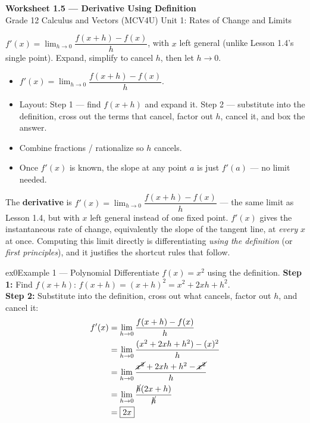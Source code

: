 \documentclass[11pt]{article}
\begin{document}
\begin{center}
{\LARGE\bfseries\color{titleblue}Worksheet 1.5 --- Derivative Using Definition}\\[2pt]
{\small Grade 12 Calculus and Vectors (MCV4U) \textperiodcentered{} Unit 1: Rates of Change and Limits}
\end{center}

\begin{ideabox}
$f'(x)=\displaystyle\lim_{h\to0}\dfrac{f(x+h)-f(x)}{h}$, with $x$ left general (unlike Lesson 1.4's single point). Expand, simplify to cancel $h$, then let $h\to0$.
\begin{itemize}[leftmargin=*,itemsep=2pt]
  \item $f'(x)=\displaystyle\lim_{h\to0}\dfrac{f(x+h)-f(x)}{h}$.
  \item Layout: Step 1 --- find $f(x+h)$ and expand it. Step 2 --- substitute into the definition, cross out the terms that cancel, factor out $h$, cancel it, and box the answer.
  \item Combine fractions / rationalize so $h$ cancels.
  \item Once $f'(x)$ is known, the slope at any point $a$ is just $f'(a)$ --- no limit needed.
\end{itemize}
\end{ideabox}

\begin{learnbox}
The \textbf{derivative} is $f'(x)=\displaystyle\lim_{h\to0}\dfrac{f(x+h)-f(x)}{h}$ — the same limit as Lesson 1.4, but with $x$ left general instead of one fixed point.
$f'(x)$ gives the instantaneous rate of change, equivalently the slope of the tangent line, at \emph{every} $x$ at once.
Computing this limit directly is differentiating \emph{using the definition} (or \emph{first principles}), and it justifies the shortcut rules that follow.
\end{learnbox}


\begin{example}{ex0}{Example 1 --- Polynomial}
Differentiate $f(x)=x^2$ using the definition.\soln
\textbf{Step 1:} Find $f(x+h)$: $f(x+h)=(x+h)^2=x^2+2xh+h^2$.\\[3pt]
\textbf{Step 2:} Substitute into the definition, cross out what cancels, factor out $h$, and cancel it:
\begin{align*}
f'(x)&=\lim_{h\to0}\frac{f(x+h)-f(x)}{h}\\
&=\lim_{h\to0}\frac{(x^2+2xh+h^2)-(x)^2}{h}\\
&=\lim_{h\to0}\frac{\cancel{x^2}+2xh+h^2-\cancel{x^2}}{h}\\
&=\lim_{h\to0}\frac{\cancel{h}(2x+h)}{\cancel{h}}\\
&=\boxed{2x}
\end{align*}
\end{example}
\end{document}
